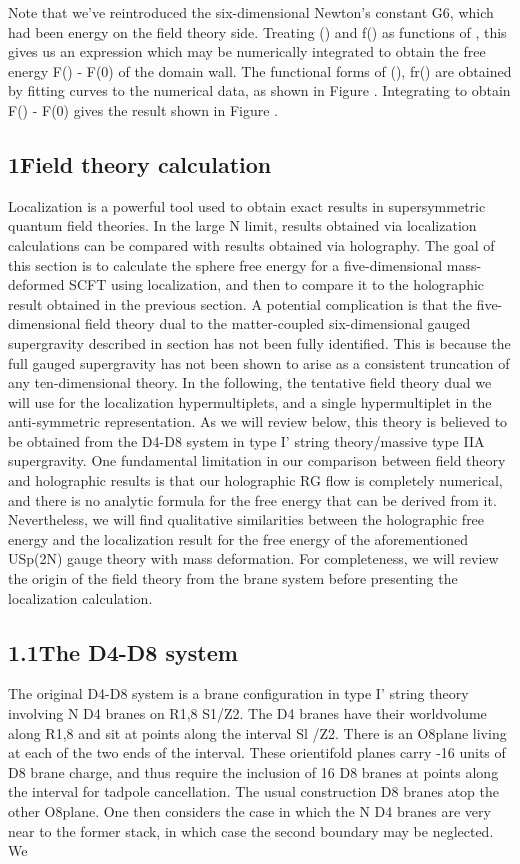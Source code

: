 \documentclass{article}
\begin{document}
\sloppy

Note that we've reintroduced the six-dimensional Newton's constant G6, which had been
energy on the field theory side. Treating () and f() as functions of , this gives us an
expression which may be numerically integrated to obtain the free energy F() - F(0) of
the domain wall. The functional forms of (), fr() are obtained by fitting curves to the
numerical data, as shown in Figure . Integrating to obtain F() - F(0) gives the result
shown in Figure .


\subsection*{1Field theory calculation}


Localization is a powerful tool used to obtain exact results in supersymmetric quantum field
theories. In the large N limit, results obtained via localization calculations can be compared
with results obtained via holography. The goal of this section is to calculate the sphere free
energy for a five-dimensional mass-deformed SCFT using localization, and then to compare
it to the holographic result obtained in the previous section. A potential complication
is that the five-dimensional field theory dual to the matter-coupled six-dimensional gauged
supergravity described in section has not been fully identified. This is because the full gauged
supergravity has not been shown to arise as a consistent truncation of any ten-dimensional
theory. In the following, the tentative field theory dual we will use for the localization
hypermultiplets, and a single hypermultiplet in the anti-symmetric representation. As we
will review below, this theory is believed to be obtained from the D4-D8 system in type I'
string theory/massive type IIA supergravity. One fundamental limitation in our comparison
between field theory and holographic results is that our holographic RG flow is completely
numerical, and there is no analytic formula for the free energy that can be derived from it.
Nevertheless, we will find qualitative similarities between the holographic free energy and
the localization result for the free energy of the aforementioned USp(2N) gauge theory with
mass deformation. For completeness, we will review the origin of the field theory from the
brane system before presenting the localization calculation.


\subsection*{1.1The D4-D8 system}


The original D4-D8 system is a brane configuration in type I' string theory involving N D4
branes on R1,8  S1/Z2. The D4 branes have their worldvolume along R1,8 and sit at points
along the interval Sl /Z2. There is an O8plane living at each of the two ends of the interval.
These orientifold planes carry -16 units of D8 brane charge, and thus require the inclusion
of 16 D8 branes at points along the interval for tadpole cancellation. The usual construction
D8 branes atop the other O8plane. One then considers the case in which the N D4 branes
are very near to the former stack, in which case the second boundary may be neglected. We
\end{document}
